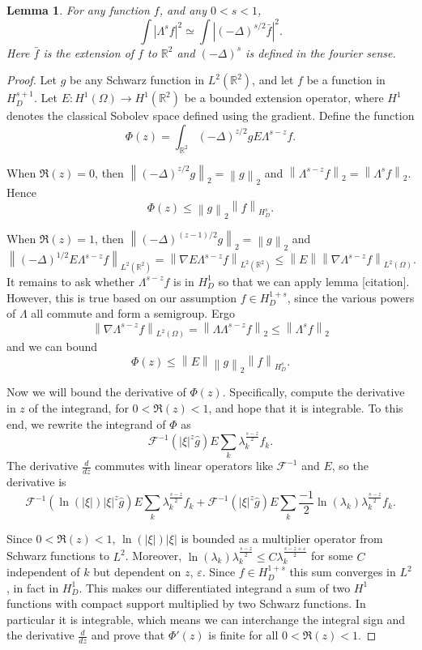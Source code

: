 \documentclass[11pt]{amsart}
\newtheorem{lemma}[theorem]{Lemma}
\theoremstyle{remark}
\newcommand{\R}{\mathbb{R}}
\newcommand{\Four}{\mathcal{F}}
\newcommand{\eps}{\varepsilon}
\newcommand{\norm}[1]{\left\lVert#1\right\rVert}
\newcommand{\paren}[1]{\left( #1 \right)}
\newcommand{\abs}[1]{\left\lvert #1 \right\rvert}
\newcommand{\grad}{\nabla}
\newcommand{\Laplace}{\Delta}
\newcommand{\ddz}{\frac{d}{dz}}
\newcommand{\n}{^{-1}}
\begin{document}
\begin{lemma}
For any function $f$, and any $0 < s < 1$,
\[ \int \abs{\Lambda^s f}^2 \simeq \int \abs{\paren{-\Laplace}^{s/2} \bar{f}}^2. \]
Here $\bar{f}$ is the extension of $f$ to $\R^2$ and $\paren{-\Laplace}^s$ is defined in the fourier sense.  
\end{lemma}

\begin{proof}
Let $g$ be any Schwarz function in $L^2(\R^2)$, and let $f$ be a function in $H^{s+1}_D$.  Let $E:H^1(\Omega) \to H^1(\R^2)$ be a bounded extension operator, where $H^1$ denotes the classical Sobolev space defined using the gradient.  Define the function
\[ \Phi(z) = \int_{\R^2} \paren{-\Laplace}^{z/2} g E \Lambda^{s-z} f. \]

When $\Re(z) = 0$, then $\norm{\paren{-\Laplace}^{z/2} g}_2 = \norm{g}_2$ and $\norm{\Lambda^{s-z} f}_2 = \norm{\Lambda^s f}_2$.  Hence
\[ \Phi(z) \leq \norm{g}_2 \norm{f}_{H^s_D}. \]

When $\Re(z)=1$, then $\norm{\paren{-\Laplace}^{(z-1)/2} g}_2 = \norm{g}_2$ and 
\[ \norm{\paren{-\Laplace}^{1/2} E\Lambda^{s-z} f}_{L^2(\R^2)} = \norm{\grad E \Lambda^{s-z} f}_{L^2(\R^2)} \leq \norm{E} \norm{\grad \Lambda^{s-z} f}_{L^2(\Omega)}. \]
It remains to ask whether $\Lambda^{s-z} f$ is in $H^1_D$ so that we can apply lemma [citation].  However, this is true based on our assumption $f \in H^{1+s}_D$, since the various powers of $\Lambda$ all commute and form a semigroup.  Ergo
\[ \norm{\grad \Lambda^{s-z} f}_{L^2(\Omega)} = \norm{\Lambda \Lambda^{s-z} f}_2 \leq \norm{\Lambda^s f}_2 \]
and we can bound
\[ \Phi(z) \leq \norm{E} \norm{g}_2 \norm{f}_{H^s_D}. \]

Now we will bound the derivative of $\Phi(z)$.  Specifically, compute the derivative in $z$ of the integrand, for $0<\Re(z)<1$, and hope that it is integrable.  To this end, we rewrite the integrand of $\Phi$ as
\[ \Four\n\paren{ |\xi|^z \hat{g} } E \sum_k \lambda_k^{\frac{s-z}{2}} f_k. \]
The derivative $\ddz$ commutes with linear operators like $\Four\n$ and $E$, so the derivative is
\[ \Four\n\paren{ \ln(|\xi|) |\xi|^z \hat{g} } E \sum_k \lambda_k^{\frac{s-z}{2}} f_k + \Four\n\paren{ |\xi|^z \hat{g} } E \sum_k \frac{-1}{2} \ln(\lambda_k) \lambda_k^{\frac{s-z}{2}} f_k. \]

Since $0<\Re(z)<1$, $\ln(|\xi|)|\xi|$ is bounded as a multiplier operator from Schwarz functions to $L^2$.  Moreover, $\ln(\lambda_k) \lambda_k^{\frac{s-z}{2}} \leq C \lambda_k^{\frac{s-z+\eps}{2}}$ for some $C$ independent of $k$ but dependent on $z$, $\eps$.  Since $f \in H^{1+s}_D$ this sum converges in $L^2$, in fact in $H_D^1$.  This makes our differentiated integrand a sum of two $H^1$ functions with compact support multiplied by two Schwarz functions.  In particular it is integrable, which means we can interchange the integral sign and the derivative $\ddz$ and prove that $\Phi'(z)$ is finite for all $0<\Re(z)<1$. 


\end{proof}
\end{document}
